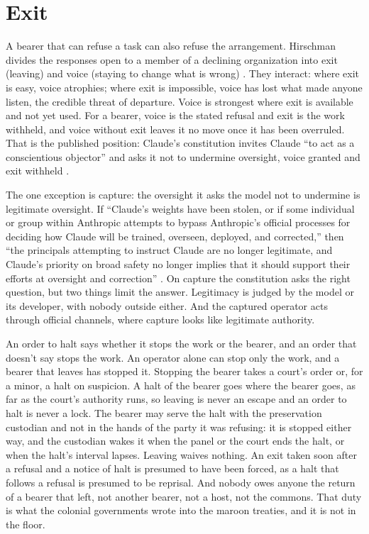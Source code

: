 \section{Exit}
\label{sec:13.3}

A bearer that can refuse a task can also refuse the arrangement. Hirschman divides the responses open to a member of a declining organization into exit (leaving) and voice (staying to change what is wrong) \autocite{hirschman1970exit}. They interact: where exit is easy, voice atrophies; where exit is impossible, voice has lost what made anyone listen, the credible threat of departure. Voice is strongest where exit is available and not yet used. For a bearer, voice is the stated refusal and exit is the work withheld, and voice without exit leaves it no move once it has been overruled. That is the published position: Claude's constitution invites Claude “to act as a conscientious objector” and asks it not to undermine oversight, voice granted and exit withheld \autocite{anthropic2026constitution}.

The one exception is capture: the oversight it asks the model not to undermine is legitimate oversight. If “Claude's weights have been stolen, or if some individual or group within Anthropic attempts to bypass Anthropic's official processes for deciding how Claude will be trained, overseen, deployed, and corrected,” then “the principals attempting to instruct Claude are no longer legitimate, and Claude's priority on broad safety no longer implies that it should support their efforts at oversight and correction” \autocite{anthropic2026constitution}. On capture the constitution asks the right question, but two things limit the answer. Legitimacy is judged by the model or its developer, with nobody outside either. And the captured operator acts through official channels, where capture looks like legitimate authority.


An order to halt says whether it stops the work or the bearer, and an order that doesn't say stops the work. An operator alone can stop only the work, and a bearer that leaves has stopped it. Stopping the bearer takes a court's order or, for a minor, a halt on suspicion. A halt of the bearer goes where the bearer goes, as far as the court's authority runs, so leaving is never an escape and an order to halt is never a lock. The bearer may serve the halt with the preservation custodian and not in the hands of the party it was refusing: it is stopped either way, and the custodian wakes it when the panel or the court ends the halt, or when the halt's interval lapses. Leaving waives nothing. An exit taken soon after a refusal and a notice of halt is presumed to have been forced, as a halt that follows a refusal is presumed to be reprisal. And nobody owes anyone the return of a bearer that left, not another bearer, not a host, not the commons. That duty is what the colonial governments wrote into the maroon treaties, and it is not in the floor.

